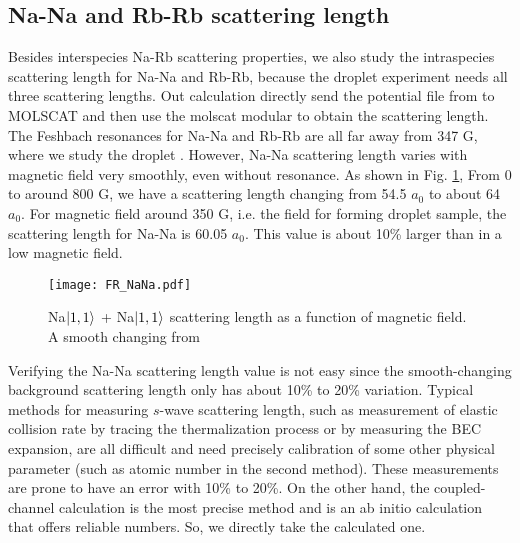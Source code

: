 \subsection{Na-Na and Rb-Rb scattering length}

Besides interspecies Na-Rb scattering properties, we also study the intraspecies scattering length for Na-Na and Rb-Rb, because the droplet experiment needs all three scattering lengths. Out calculation directly send the potential file from \cite{} to MOLSCAT \cite{} and then use the molscat modular to obtain the scattering length. The Feshbach resonances for Na-Na and Rb-Rb are all far away from 347 G, where we study the droplet \cite{}. However, Na-Na scattering length varies with magnetic field very smoothly, even without resonance. As shown in Fig. \ref{FR_NaNa}, From 0 to around 800 G, we have a scattering length changing from 54.5 $a_0$ to about 64 $a_0$. For magnetic field around 350 G, i.e. the field for forming droplet sample, the scattering length for Na-Na is 60.05 $a_0$. This value is about 10\% larger than in a low magnetic field. 

\begin{figure}[htb]
\begin{center}
\texttt{[image: FR\_NaNa.pdf]}
\end{center}
\caption[Na$\ket{1,1}$ + Na$\ket{1,1}$ scattering length as a function of magnetic field]{Na$\ket{1,1}$ + Na$\ket{1,1}$ scattering length as a function of magnetic field. A smooth changing from }
\label{FR_NaNa}
\end{figure}

Verifying the Na-Na scattering length value is not easy since the smooth-changing background scattering length only has about 10\% to 20\% variation. Typical methods for measuring $s$-wave scattering length, such as measurement of elastic collision rate by tracing the thermalization process\cite{} or by measuring the BEC expansion\cite{}, are all difficult and need precisely calibration of some other physical parameter (such as atomic number in the second method). These measurements are prone to have an error with 10\% to 20\%. On the other hand, the coupled-channel calculation is the most precise method and is an ab initio calculation that offers reliable numbers. So, we directly take the calculated one.